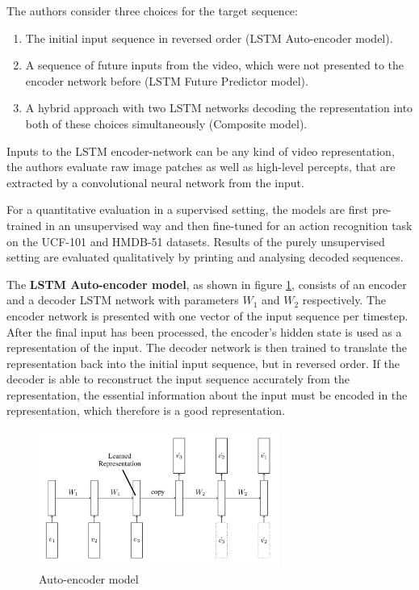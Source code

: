 The authors consider three choices for the target sequence:
\begin{enumerate}
    \item The initial input sequence in reversed order (LSTM Auto-encoder model).
    \item A sequence of future inputs from the video, which were not presented to the encoder network before (LSTM Future Predictor model).
    \item A hybrid approach with two LSTM networks decoding the representation into both of these choices simultaneously (Composite model).
\end{enumerate}

Inputs to the LSTM encoder-network can be any kind of video representation, the authors evaluate raw image patches as well as high-level percepts, that are extracted by a convolutional neural network from the input. 

For a quantitative evaluation in a supervised setting, the models are first pre-trained in an unsupervised way and then fine-tuned for an action recognition task on the UCF-101 and HMDB-51 datasets.
Results of the purely unsupervised setting are evaluated qualitatively by printing and analysing decoded sequences.

The \textbf{LSTM Auto-encoder model}, as shown in figure \ref{fig:unsupervisedlstms_autoencoder}, consists of an encoder and a decoder LSTM network with parameters $W_1$ and $W_2$ respectively.
The encoder network is presented with one vector of the input sequence per timestep.
After the final input has been processed, the encoder's hidden state is used as a representation of the input.
The decoder network is then trained to translate the representation back into the initial input sequence, but in reversed order.
If the decoder is able to reconstruct the input sequence accurately from the representation, the essential information about the input must be encoded in the representation, which therefore is a good representation.

\begin{figure}[H]
    \centering
    \includegraphics[width=0.7\textwidth]{img_deep/unsupervisedlstms_autoencoder}
    \caption{Auto-encoder model \cite{srivastava_unsupervised_2015}}
    \label{fig:unsupervisedlstms_autoencoder}
\end{figure}

